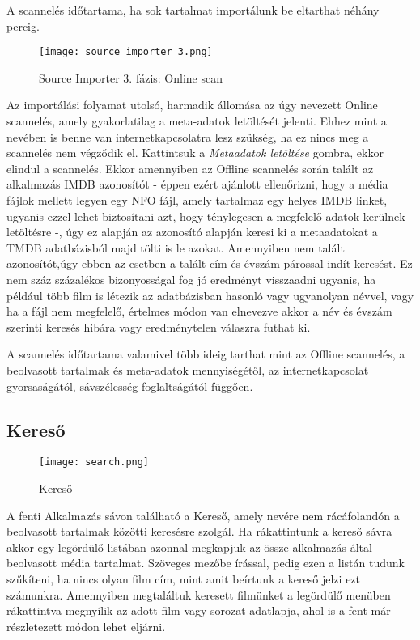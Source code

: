 A scannelés időtartama, ha sok tartalmat importálunk be eltarthat néhány percig.

\begin{figure}[H]
	\centering
	\texttt{[image: source\_importer\_3.png]}
	\caption{Source Importer 3. fázis: Online scan}
	\label{fig:source_importer_3}
\end{figure}
Az importálási folyamat utolsó, harmadik állomása az úgy nevezett Online scannelés, amely gyakorlatilag a meta-adatok letöltését jelenti. Ehhez mint a nevében is benne van internetkapcsolatra lesz szükség, ha ez nincs meg a scannelés nem végződik el. Kattintsuk a {\it Metaadatok letöltése} gombra, ekkor elindul a scannelés.
Ekkor amennyiben az Offline scannelés során talált az alkalmazás IMDB azonosítót - éppen ezért ajánlott ellenőrizni, hogy a média fájlok mellett legyen egy NFO fájl, amely tartalmaz egy helyes IMDB linket, ugyanis ezzel lehet biztosítani azt, hogy ténylegesen a megfelelő adatok kerülnek letöltésre -, úgy ez alapján az azonosító alapján keresi ki a metaadatokat a TMDB adatbázisból majd tölti is le azokat. Amennyiben nem talált azonosítót,úgy ebben az esetben a talált cím és évszám párossal indít keresést. Ez nem száz százalékos bizonyosságal fog jó eredményt visszaadni ugyanis, ha például több film is létezik az adatbázisban hasonló vagy ugyanolyan névvel, vagy ha a fájl nem megfelelő, értelmes módon van elnevezve akkor a név és évszám szerinti keresés hibára vagy eredménytelen válaszra futhat ki.

A scannelés időtartama valamivel több ideig tarthat mint az Offline scannelés, a beolvasott tartalmak és meta-adatok mennyiségétől, az internetkapcsolat gyorsaságától, sávszélesség foglaltságától függően.

\subsection{Kereső}
\begin{figure}[H]
	\centering
	\texttt{[image: search.png]}
	\caption{Kereső}
	\label{fig:search}
\end{figure}
A fenti Alkalmazás sávon található a Kereső, amely nevére nem rácáfolandón a beolvasott tartalmak közötti keresésre szolgál. Ha rákattintunk a kereső sávra akkor egy legördülő listában azonnal megkapjuk az össze alkalmazás által beolvasott média tartalmat. Szöveges mezőbe írással, pedig ezen a listán tudunk szűkíteni, ha nincs olyan film cím, mint amit beírtunk a kereső jelzi ezt számunkra. Amennyiben megtaláltuk keresett filmünket a legördülő menüben rákattintva megnyílik az adott film vagy sorozat adatlapja, ahol is a fent már részletezett módon lehet eljárni.

